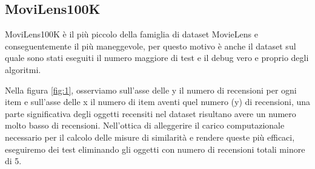 \documentclass[12pt]{article}
\begin{document}
\subsection{MoviLens100K}
\label{MoviLens100K}
MoviLens100K è il più piccolo della famiglia di dataset MovieLens e conseguentemente il più maneggevole, per questo motivo è anche il dataset sul quale sono stati eseguiti il numero maggiore di test e il debug vero e proprio degli algoritmi.

Nella figura \ref{fig:1}, osserviamo sull'asse delle y il numero di recensioni per ogni item e sull'asse delle x il numero di item aventi quel numero (y) di recensioni, una parte significativa degli oggetti recensiti nel dataset risultano avere un numero molto basso di recensioni.
Nell'ottica di alleggerire il carico computazionale necessario per il calcolo delle misure di similarità e rendere queste più efficaci, eseguiremo dei test eliminando gli oggetti con numero di recensioni totali minore di 5.

\end{document}
